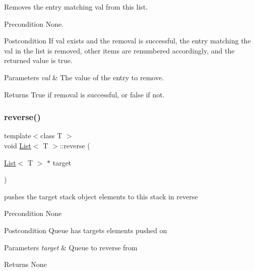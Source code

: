 Removes the entry matching val from this list. \begin{DoxyPrecond}{Precondition}
None. 
\end{DoxyPrecond}
\begin{DoxyPostcond}{Postcondition}
If val exists and the removal is successful, the entry matching the val in the list is removed, other items are renumbered accordingly, and the returned value is true. 
\end{DoxyPostcond}

\begin{DoxyParams}{Parameters}
{\em val} & The value of the entry to remove. \\
\hline
\end{DoxyParams}
\begin{DoxyReturn}{Returns}
True if removal is successful, or false if not. 
\end{DoxyReturn}
\mbox{\label{class_list_ac17012219fedb7d746f5c13501af164e}} 
\subsubsection{\texorpdfstring{reverse()}{reverse()}}
{\footnotesize\ttfamily template$<$class T $>$ \\
void \hyperlink{class_list}{List}$<$ T $>$\+::reverse (\begin{DoxyParamCaption}\item[{\hyperlink{class_list}{List}$<$ T $>$ $\ast$}]{target }\end{DoxyParamCaption})}

pushes the target stack object elements to this stack in reverse \begin{DoxyPrecond}{Precondition}
None 
\end{DoxyPrecond}
\begin{DoxyPostcond}{Postcondition}
Queue has target\textquotesingle{}s elements pushed on 
\end{DoxyPostcond}

\begin{DoxyParams}{Parameters}
{\em target} & Queue to reverse from \\
\hline
\end{DoxyParams}
\begin{DoxyReturn}{Returns}
None 
\end{DoxyReturn}
\mbox{\label{class_list_aec8852ab225094e14ad424e8d71a4dac}} 
